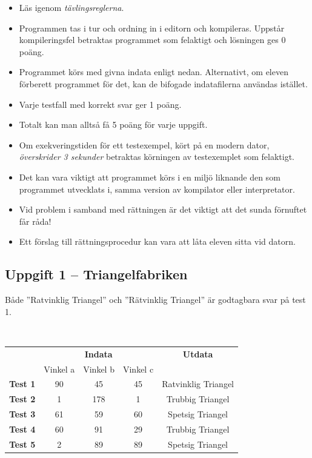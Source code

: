 \documentclass[a4paper,12pt,oneside]{amsbook}
\theoremstyle{test}
\newcommand{\fe}[1]{\textbf{#1}}            %
\begin{document}


\thispagestyle{fancy}
\lhead{}
\begin{itemize}
\item Läs igenom \textit{tävlingsreglerna}.
\item Programmen tas i tur och ordning in i editorn och kompileras.
Uppstår kompileringsfel betraktas programmet som felaktigt och lösningen
ges $0$ poäng.
\item Programmet körs med givna indata enligt nedan. Alternativt, om eleven förberett programmet för det, kan de bifogade indatafilerna användas istället.
\item Varje testfall
  med korrekt svar ger 1 poäng.
\item
Totalt kan man
  alltså få 5 poäng för varje uppgift.
\item Om exekveringstiden för ett testexempel, kört på en modern dator,
\textit{överskrider 3 sekunder} betraktas körningen av testexemplet som felaktigt.
\item Det kan vara viktigt att programmet körs i en miljö liknande den som
programmet utvecklats i, samma version av kompilator eller
interpretator.
\item Vid problem i samband med rättningen är det viktigt att det sunda
förnuftet får råda!
\item Ett förslag till rättningsprocedur kan vara att låta eleven
sitta vid datorn.
\end{itemize}

\vspace{1cm}

\subsection*{Uppgift 1 -- Triangelfabriken}
Både ''Ratvinklig Triangel'' och ''Rätvinklig Triangel'' är godtagbara svar på test 1.
~\\
{\tt 
\begin{tabular}{||l||c|c|c||c||}\hline\hline
& \multicolumn{3}{c||}{\fe{Indata}} & \multicolumn{1}{c||}{\fe{Utdata}} \\ 
& Vinkel a & Vinkel b & Vinkel c &  \\ \hline \hline
\fe{Test 1} & 90 & 45  & 45 & Ratvinklig Triangel\\ \hline
\fe{Test 2} & 1  & 178 & 1  & Trubbig Triangel\\ \hline
\fe{Test 3} & 61 & 59  & 60 & Spetsig Triangel\\ \hline
\fe{Test 4} & 60 & 91  & 29 & Trubbig Triangel\\ \hline
\fe{Test 5} & 2  & 89  & 89 & Spetsig Triangel\\ \hline\hline
\end{tabular}
}
\end{document}
